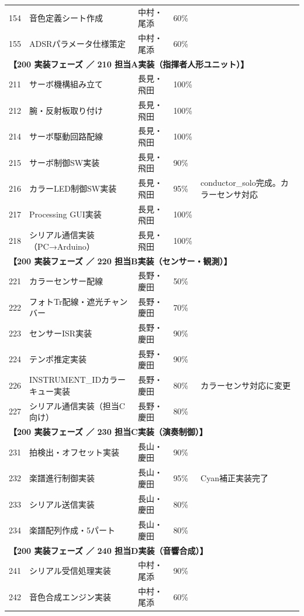 \begin{longtable}{p{0.9cm}p{7cm}p{2.5cm}p{2cm}p{2cm}}
154 & 音色定義シート作成 & 中村・尾添 & 60\% &  \\
155 & ADSRパラメータ仕様策定 & 中村・尾添 & 60\% &  \\
\midrule
\multicolumn{5}{l}{\textbf{【200 実装フェーズ ／ 210 担当A実装（指揮者人形ユニット）】}} \\
\midrule
211 & サーボ機構組み立て & 長見・飛田 & 100\% &  \\
212 & 腕・反射板取り付け & 長見・飛田 & 100\% &  \\
214 & サーボ駆動回路配線 & 長見・飛田 & 100\% &  \\
215 & サーボ制御SW実装 & 長見・飛田 & 90\% &  \\
216 & カラーLED制御SW実装 & 長見・飛田 & 95\% & conductor\_solo完成。カラーセンサ対応 \\
217 & Processing GUI実装 & 長見・飛田 & 100\% &  \\
218 & シリアル通信実装（PC→Arduino） & 長見・飛田 & 100\% &  \\
\midrule
\multicolumn{5}{l}{\textbf{【200 実装フェーズ ／ 220 担当B実装（センサー・観測）】}} \\
\midrule
221 & カラーセンサー配線 & 長野・慶田 & 50\% &  \\
222 & フォトTr配線・遮光チャンバー & 長野・慶田 & 70\% &  \\
223 & センサーISR実装 & 長野・慶田 & 90\% &  \\
224 & テンポ推定実装 & 長野・慶田 & 90\% &  \\
226 & INSTRUMENT\_IDカラーキュー実装 & 長野・慶田 & 80\% & カラーセンサ対応に変更 \\
227 & シリアル通信実装（担当C向け） & 長野・慶田 & 80\% &  \\
\midrule
\multicolumn{5}{l}{\textbf{【200 実装フェーズ ／ 230 担当C実装（演奏制御）】}} \\
\midrule
231 & 拍検出・オフセット実装 & 長山・慶田 & 90\% &  \\
232 & 楽譜進行制御実装 & 長山・慶田 & 95\% & Cyan補正実装完了 \\
233 & シリアル送信実装 & 長山・慶田 &  80\%&  \\
234 & 楽譜配列作成・5パート & 長山・慶田 &  80\%&  \\
\midrule
\multicolumn{5}{l}{\textbf{【200 実装フェーズ ／ 240 担当D実装（音響合成）】}} \\
\midrule
241 & シリアル受信処理実装 & 中村・尾添 & 90\% &  \\
242 & 音色合成エンジン実装 & 中村・尾添 & 60\% &  \\

\end{longtable}
